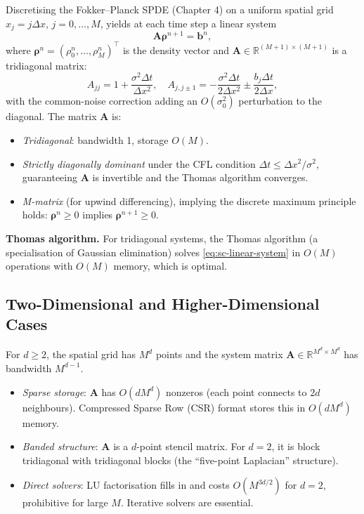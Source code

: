 Discretising the Fokker--Planck SPDE (Chapter 4) on a uniform spatial grid
$x_j = j\Delta x$, $j = 0, \ldots, M$, yields at each time step a linear system
\begin{equation}
    \mathbf{A} \boldsymbol{\rho}^{n+1} = \mathbf{b}^n,
    \label{eq:sc-linear-system}
\end{equation}
where $\boldsymbol{\rho}^n = (\rho^n_0, \ldots, \rho^n_M)^\top$ is the density
vector and $\mathbf{A} \in \mathbb{R}^{(M+1)\times(M+1)}$ is a tridiagonal matrix:
\begin{equation}
    A_{jj} = 1 + \frac{\sigma^2 \Delta t}{\Delta x^2}, \quad
    A_{j,j\pm 1} = -\frac{\sigma^2 \Delta t}{2\Delta x^2} \pm
    \frac{b_j \Delta t}{2\Delta x},
    \label{eq:sc-tridiagonal}
\end{equation}
with the common-noise correction adding an $O(\sigma_0^2)$ perturbation to the
diagonal. The matrix $\mathbf{A}$ is:
\begin{itemize}
    \item \textit{Tridiagonal}: bandwidth 1, storage $O(M)$.
    \item \textit{Strictly diagonally dominant} under the CFL condition
    $\Delta t \le \Delta x^2 / \sigma^2$, guaranteeing $\mathbf{A}$ is invertible
    and the Thomas algorithm converges.
    \item \textit{M-matrix} (for upwind differencing), implying the discrete
    maximum principle holds: $\boldsymbol{\rho}^n \ge 0$ implies
    $\boldsymbol{\rho}^{n+1} \ge 0$.
\end{itemize}
\textbf{Thomas algorithm.} For tridiagonal systems, the Thomas algorithm
(a specialisation of Gaussian elimination) solves \eqref{eq:sc-linear-system}
in $O(M)$ operations with $O(M)$ memory, which is optimal.

\subsection{Two-Dimensional and Higher-Dimensional Cases}

For $d \ge 2$, the spatial grid has $M^d$ points and the system matrix
$\mathbf{A} \in \mathbb{R}^{M^d \times M^d}$ has bandwidth $M^{d-1}$.
\begin{itemize}
    \item \textit{Sparse storage}: $\mathbf{A}$ has $O(d M^d)$ nonzeros (each
    point connects to $2d$ neighbours). Compressed Sparse Row (CSR) format
    stores this in $O(d M^d)$ memory.
    \item \textit{Banded structure}: $\mathbf{A}$ is a $d$-point stencil matrix.
    For $d=2$, it is block tridiagonal with tridiagonal blocks (the ``five-point
    Laplacian'' structure).
    \item \textit{Direct solvers}: LU factorisation fills in and costs $O(M^{3d/2})$
    for $d=2$, prohibitive for large $M$. Iterative solvers are essential.
\end{itemize}

